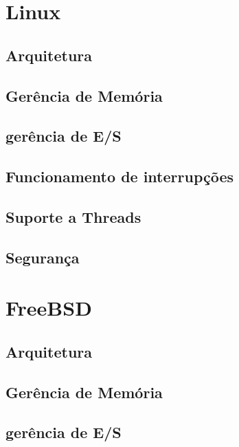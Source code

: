 \documentclass[conference]{IEEEtran}
\begin{document}
\section{Linux}\label{sec:linux}

\subsection{Arquitetura}\label{sec:LinuxArq}

\subsection{Gerência de Memória}\label{sec:LinuxMem}

\subsection{gerência de E/S}\label{sec:LinuxES}

\subsection{Funcionamento de interrupções}\label{sec:LinuxInt}

\subsection{Suporte a Threads}\label{sec:TinuxThreads}

\subsection{Segurança}\label{sec:LinuxSec}

\section{FreeBSD}\label{sec:BSD}

\subsection{Arquitetura}\label{sec:BSDArq}

\subsection{Gerência de Memória}\label{sec:BSDMem}

\subsection{gerência de E/S}\label{sec:BSDES}
\end{document}
